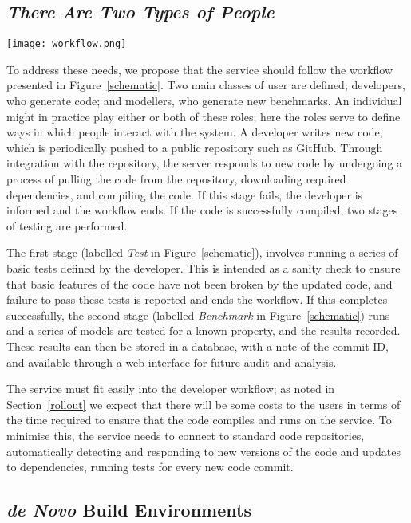 \documentclass[conference]{IEEEtran}
\begin{document}
\subsection{{\emph{There Are Two Types of People}}}

\begin{figure*}[!htp]
	\centering
	\texttt{[image: workflow.png]}
	\caption{Proposed reproducibility service workflow}
	\label{schematic}
\end{figure*}

To address these needs, we propose that the service should follow the
workflow presented in Figure~\ref{schematic}. Two main classes of user are
defined; developers, who generate code; and modellers, who generate
new benchmarks. An individual might in practice play either or both of
these roles; here the roles serve to define ways in which people
interact with the system. A developer writes new code, which is
periodically pushed to a public repository such as GitHub. Through
integration with the repository, the server responds to new code by
undergoing a process of pulling the code from the repository,
downloading required dependencies, and compiling the code. If this
stage fails, the developer is informed and the workflow ends. If the
code is successfully compiled, two stages of testing are
performed.

The first stage (labelled {\emph{Test}} in Figure~\ref{schematic}),
involves running a series of basic tests defined by the
developer. This is intended as a sanity check to ensure that basic
features of the code have not been broken by the updated code, and
failure to pass these tests is reported and ends the workflow. If this
completes successfully, the second stage (labelled {\emph{Benchmark}}
in Figure~\ref{schematic}) runs and a series of models are tested for
a known property, and the results recorded. These results can then be
stored in a database, with a note of the commit ID, and available
through a web interface for future audit and analysis.

The service must fit easily into the developer workflow; as noted in
Section~\ref{rollout} we expect that there will be some costs to the
users in terms of the time required to ensure that the code compiles
and runs on the service. To minimise this, the service needs to
connect to standard code repositories, automatically detecting and
responding to new versions of the code and updates to dependencies,
running tests for every new code commit.

\subsection{{\emph{de Novo}} Build Environments}
\end{document}
